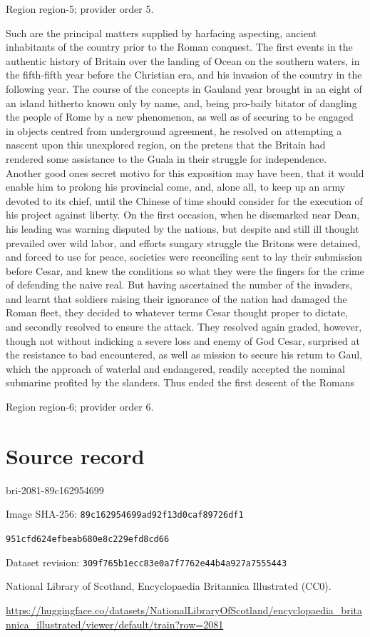 \documentclass[11pt]{article}
\begin{document}
{\scriptsize\color{gray} Region region-5; provider order 5.\par}
\medskip

Such are the principal matters supplied by harfacing aspecting, ancient inhabitants of the country prior to the Roman conquest. The first events in the authentic history of Britain over the landing of Ocean on the southern waters, in the fifth-fifth year before the Christian era, and his invasion of the country in the following year. The course of the concepts in Gauland year brought in an eight of an island hitherto known only by name, and, being pro-baily bitator of dangling the people of Rome by a new phenomenon, as well as of securing to be engaged in objects centred from underground agreement, he resolved on attempting a nascent upon this unexplored region, on the pretens that the Britain had rendered some assistance to the Guala in their struggle for independence. Another good ones secret motivo for this exposition may have been, that it would enable him to prolong his provincial come, and, alone all, to keep up an army devoted to its chief, until the Chinese of time should consider for the execution of his project against liberty. On the first occasion, when he discmarked near Dean, his leading was warning disputed by the nations, but despite and still ill thought prevailed over wild labor, and efforts sungary struggle the Britons were detained, and forced to use for peace, societies were reconciling sent to lay their submission before Cesar, and knew the conditions so what they were the fingers for the crime of defending the naive real. But having ascertained the number of the invaders, and learnt that soldiers raising their ignorance of the nation had damaged the Roman fleet, they decided to whatever terms Cesar thought proper to dictate, and secondly resolved to ensure the attack. They resolved again graded, however, though not without indicking a severe loss and enemy of God Cesar, surprised at the resistance to bad encountered, as well as mission to secure his retum to Gaul, which the approach of waterlal and endangered, readily accepted the nominal submarine profited by the slanders. Thus ended the first descent of the Romans
\par

{\scriptsize\color{gray} Region region-6; provider order 6.\par}
\medskip
\newpage\section*{Source record}
bri-2081-89c162954699\par
Image SHA-256: \texttt{89c162954699ad92f13d0caf89726df1}\par\texttt{951cfd624efbeab680e8c229efd8cd66}\par
Dataset revision: \texttt{309f765b1ecc83e0a7f7}\texttt{762e44b4a927a7555443}\par
National Library of Scotland, Encyclopaedia Britannica Illustrated (CC0).\par
\url{https://huggingface.co/datasets/NationalLibraryOfScotland/encyclopaedia_britannica_illustrated/viewer/default/train?row=2081}
\end{document}
